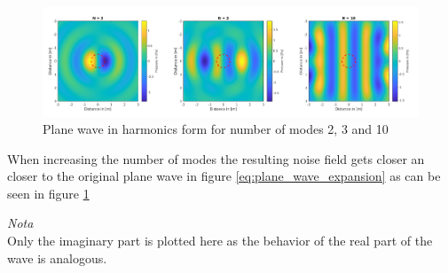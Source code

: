 \begin{figure}
    \centerline{\includegraphics[width=\paperwidth]{LaTeX/images/plots/Plane_wave_harmonics_form.png}}
    \caption{Plane wave in harmonics form for number of modes 2, 3 and 10}
    \label{fig:planeWaveHarmonics}
\end{figure}
When increasing the number of modes the resulting noise field gets closer an closer to the original plane wave in figure \ref{eq:plane_wave_expansion} as can be seen in figure \ref{fig:planeWaveHarmonics}

\textit{Nota}\\
Only the imaginary part is plotted here as the behavior of the real part of the wave is analogous.